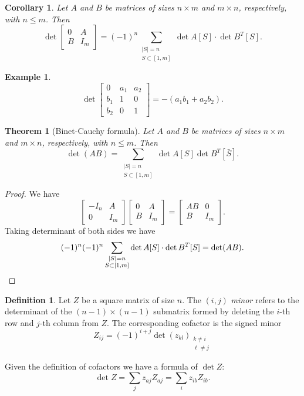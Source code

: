 \documentclass{report}
\newtheorem{theorem}{Theorem}[section]
\newtheorem{corollary}{Corollary}[section]
\theoremstyle{definition}
\newtheorem{definition}{Definition}[section]
\newtheorem{example}{Example}[section]
\theoremstyle{remark}
\numberwithin{equation}{section}
\begin{document}
\begin{corollary}
    Let $A$ and $B$ be matrices of sizes $n \times m$ and $m \times n$, respectively, with $n \leq m$. Then \[
        \det \begin{bmatrix}
            0 & A \\
            B & I_m
        \end{bmatrix} = (-1)^n\sum_{\substack{|S| = n \\ S \subset [1, m]}} \det A[S] \cdot \det B^T[S].   
    \]
\end{corollary}
\begin{example}
    \[ \det \begin{bmatrix}
        0 & a_1 & a_2 \\
        b_1 & 1 & 0 \\
        b_2 & 0 & 1
    \end{bmatrix} = -(a_1b_1 + a_2b_2). \]
\end{example}

\begin{theorem}[Binet-Cauchy formula]
    Let $A$ and $B$ be matrices of sizes $n \times m$ and $m \times n$, respectively, with $n \leq m$. Then \[
        \det (AB) = \sum_{\substack{|S| = n \\S \subset [1, m]}} \det A[S] \det B^T[\bar{S}].    
    \]
\end{theorem}
\begin{proof}
    We have \[
        \begin{bmatrix}
            -I_n & A \\
            0 & I_m
        \end{bmatrix}
        \begin{bmatrix}
            0 & A \\
            B & I_m
        \end{bmatrix} = \begin{bmatrix}
            AB & 0 \\
            B & I_m
        \end{bmatrix}.
    \]
    Taking determinant of both sides we have \[
        (-1)^n(-1)^n\sum_{\substack{|S| = n \\ S \subset [1, m]}} \det A[S] \cdot \det B^T[S] = \det(AB). \qedhere
    \] 
\end{proof}

\begin{definition}
    Let $Z$ be a square matrix of size $n$. The $(i,j)$ \emph{minor} refers to the determinant of the $(n-1) \times (n-1)$ submatrix formed by deleting the $i$-th row and $j$-th column from $Z$. The corresponding cofactor is the signed minor
    \[Z_{ij} = (-1)^{i + j}\det(z_{kl})_{\substack{k \neq i \\ \ell \neq j}}\]
\end{definition}
Given the definition of cofactors we have a formula of $\det Z$:
\[
    \det Z = \sum_j z_{aj}Z_{aj} = \sum_{i}z_{ib}Z_{ib}.    
\]
\end{document}
